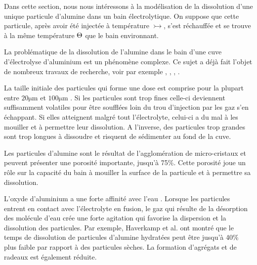 Dans cette section, nous nous intéressons à la modélisation de la
dissolution d'une unique particule d'alumine dans un bain
électrolytique. On suppose que cette particule, après avoir été
injectée à température $\tinj$, s'est réchauffée et se trouve à la
même température $\Theta$ que le bain environnant.

La problématique de la dissolution de l'alumine dans le bain d'une
cuve d'électrolyse d'aluminium est un phénomène complexe. Ce sujet a
déjà fait l'objet de nombreux travaux de recherche, voir par exemple
\cite{Dassylva2015}, \cite{Kvande1986}, \cite{Gerlach1975},
\cite{Solheim1995}.

La taille initiale des particules qui forme une dose est comprise pour
la plupart entre $\num{20}\si{\micro\meter}$ et
$\num{100}\si{\micro\meter}$ \cite{Fini2017}. Si les particules sont
trop fines celle-ci deviennent suffisamment volatiles pour être
soufflées loin du trou d'injection par les gaz s'en échappant. Si
elles atteignent malgré tout l'électrolyte, celui-ci a du mal à les
mouiller et à permettre leur dissolution. A l'inverse, des particules
trop grandes sont trop longues à dissoudre et risquent de sédimenter
au fond de la cuve.

Les particules d'alumine sont le résultat de l'agglomération de
micro-cristaux et peuvent présenter une porosité importante, jusqu'à
\num{75}\%. Cette porosité joue un rôle sur la capacité du bain à
mouiller la surface de la particule et à permettre sa dissolution.

L'oxyde d'aluminium a une forte affinité avec l'eau
\cite{Patterson2001}. Lorsque les particules entrent en contact avec
l'électrolyte en fusion, le gaz qui résulte de la désorption des
molécule d'eau crée une forte agitation qui favorise la dispersion et
la dissolution des particules. Par exemple, Haverkamp et
al. \cite{Haverkamp1994} ont montré que le temps de dissolution de
particules d'alumine hydratées peut être jusqu'à \num{40}\% plus
faible par rapport à des particules sèches. La formation d'agrégats
et de radeaux est également réduite.

